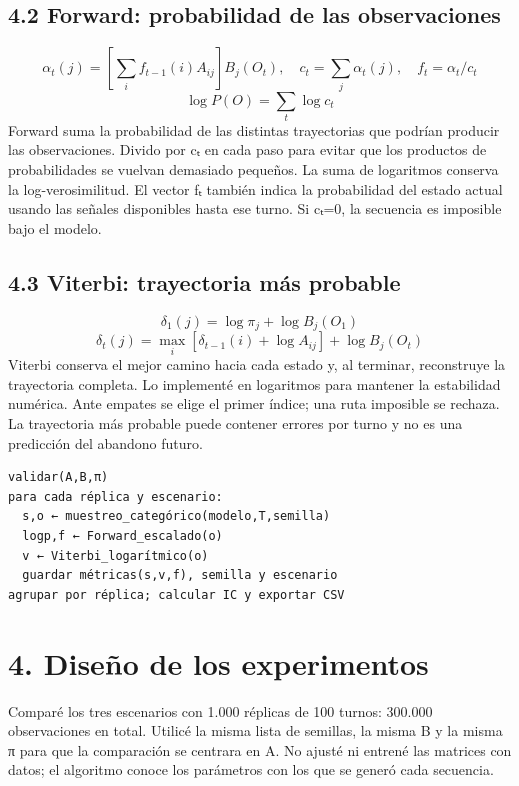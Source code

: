 \documentclass[10pt,a4paper]{article}
\begin{document}
\subsection*{4.2 Forward: probabilidad de las observaciones}
\[\alpha_t(j)=\left[\sum_i f_{t-1}(i)A_{ij}\right]B_j(O_t),\quad c_t=\sum_j\alpha_t(j),\quad f_t=\alpha_t/c_t\]\[\log P(O)=\sum_t\log c_t\]
Forward suma la probabilidad de las distintas trayectorias que podrían producir las observaciones. Divido por cₜ en cada paso para evitar que los productos de probabilidades se vuelvan demasiado pequeños. La suma de logaritmos conserva la log-verosimilitud. El vector fₜ también indica la probabilidad del estado actual usando las señales disponibles hasta ese turno. Si cₜ=0, la secuencia es imposible bajo el modelo.


\subsection*{4.3 Viterbi: trayectoria más probable}
\[\delta_1(j)=\log\pi_j+\log B_j(O_1)\]\[\delta_t(j)=\max_i[\delta_{t-1}(i)+\log A_{ij}]+\log B_j(O_t)\]
Viterbi conserva el mejor camino hacia cada estado y, al terminar, reconstruye la trayectoria completa. Lo implementé en logaritmos para mantener la estabilidad numérica. Ante empates se elige el primer índice; una ruta imposible se rechaza. La trayectoria más probable puede contener errores por turno y no es una predicción del abandono futuro.


\begin{verbatim}
validar(A,B,π)
para cada réplica y escenario:
  s,o ← muestreo_categórico(modelo,T,semilla)
  logp,f ← Forward_escalado(o)
  v ← Viterbi_logarítmico(o)
  guardar métricas(s,v,f), semilla y escenario
agrupar por réplica; calcular IC y exportar CSV
\end{verbatim}
\clearpage
\section*{4. Diseño de los experimentos}
Comparé los tres escenarios con 1.000 réplicas de 100 turnos: 300.000 observaciones en total. Utilicé la misma lista de semillas, la misma B y la misma π para que la comparación se centrara en A. No ajusté ni entrené las matrices con datos; el algoritmo conoce los parámetros con los que se generó cada secuencia.
\end{document}
